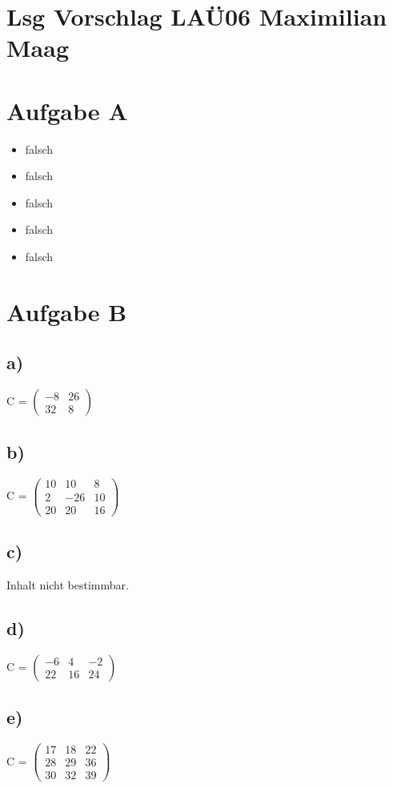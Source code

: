 \documentclass{article}
\begin{document}
	\section*{Lsg Vorschlag LAÜ06 Maximilian Maag}
	\section*{Aufgabe A}
	\begin{itemize}
		\item falsch 
		\item falsch
		\item falsch
		\item falsch
		\item falsch
	\end{itemize}
	\section*{Aufgabe B}
	\subsection*{a)}
	C = $
	\left(\begin{array}{cc}
	-8 & 26 \\  32 & 8
	\end{array}\right)$
	\subsection*{b)}
	C = $
	\left(\begin{array}{ccc}
	10 & 10 & 8 \\ 2 & -26 & 10 \\ 20 & 20 & 16 
	\end{array}\right)$
	\subsection*{c)}
	Inhalt nicht bestimmbar.
	\subsection*{d)}
	C = $
	\left(\begin{array}{ccc}
	-6 & 4 & -2 \\ 22 & 16 & 24
	\end{array}\right)$
	\subsection*{e)}
	C = $
	\left(\begin{array}{ccc}
	17 & 18 & 22 \\ 28 & 29 & 36 \\ 30 & 32 & 39	\end{array}\right)$
\end{document}
